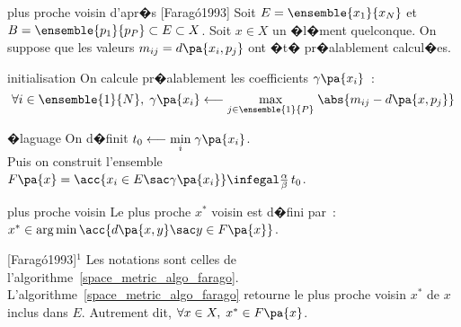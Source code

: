             \begin{xalgorithm}{plus proche voisin d'apr�s [Farag\'o1993]}\label{space_metric_algo_farago}
            Soit $E = \ensemble{x_1}{x_N}$ et $B = \ensemble{p_1}{p_P} \subset E \subset X$. Soit $x \in X$ 
            un �l�ment quelconque. 
            On suppose que les valeurs $m_{ij} = d\pa{x_i, p_j}$ ont �t� pr�alablement calcul�es.
            
            \begin{xalgostep}{initialisation}
            On calcule pr�alablement les coefficients $\gamma\pa{x_i}$~:
                              $$
                                \forall i \in \ensemble{1}{N}, \; \gamma\pa{x_i} \longleftarrow \underset{j 
                                                        \in \ensemble{1}{P} } {\max} \;
                                            \abs{ m_{ij} - d\pa{x,p_j} }
                                $$
            \end{xalgostep}        
            
            \begin{xalgostep}{�laguage}
            On d�finit $t_0 \longleftarrow \underset{i} {\min} \; \gamma\pa{x_i}$. \\
            Puis on construit l'ensemble $F\pa{x} = \acc{ x_i \in E \sac \gamma\pa{x_i} }\infegal
                         \frac{\alpha}{\beta} \, t_0$.
            \end{xalgostep}        
            
            \begin{xalgostep}{plus proche voisin}
            Le plus proche $x^*$ voisin est d�fini par~: $x^* \in \arg \min \acc{ d\pa{x,y} \sac y \in F\pa{x}}$.
            \end{xalgostep}        
            
            \end{xalgorithm}



            \begin{xtheorem}{[Farag\'o1993]$^1$}
                                                                \label{space_metric_farago_1}
            Les notations sont celles de l'algorithme~\ref{space_metric_algo_farago}.        
            L'algorithme~\ref{space_metric_algo_farago} retourne le plus proche voisin $x^*$ de $x$ inclus dans $E$. 
            Autrement dit, $\forall x \in X, \; x^* \in F\pa{x}$.
            \end{xtheorem}




